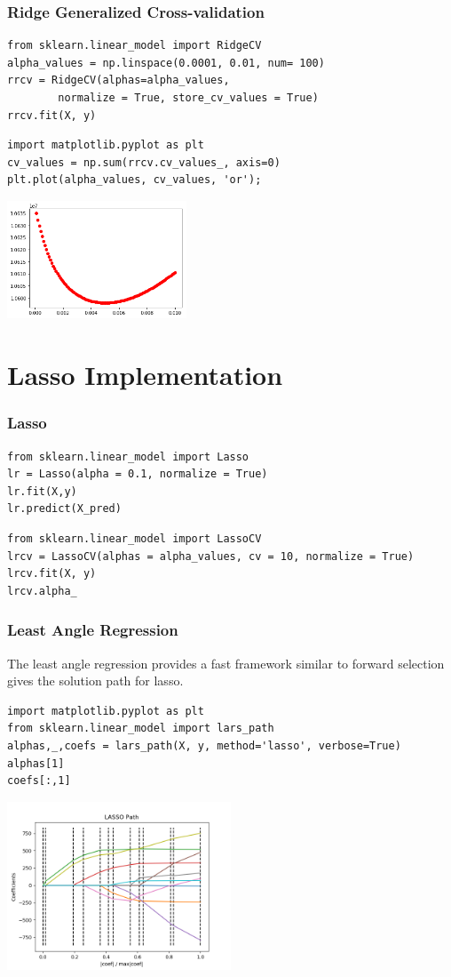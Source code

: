 \begin{frame}[fragile]\frametitle{Ridge Generalized Cross-validation}
\tiny
\begin{lstlisting}
from sklearn.linear_model import RidgeCV
alpha_values = np.linspace(0.0001, 0.01, num= 100)
rrcv = RidgeCV(alphas=alpha_values, 
		normalize = True, store_cv_values = True)
rrcv.fit(X, y)
\end{lstlisting}
\begin{lstlisting}
import matplotlib.pyplot as plt
cv_values = np.sum(rrcv.cv_values_, axis=0)
plt.plot(alpha_values, cv_values, 'or');
\end{lstlisting}
\includegraphics[width=0.4\textwidth]{fig/ridge_gcv}
\end{frame}

\section{Lasso Implementation}

\begin{frame}[fragile]\frametitle{Lasso}
\tiny	
\begin{lstlisting}
from sklearn.linear_model import Lasso
lr = Lasso(alpha = 0.1, normalize = True)
lr.fit(X,y)
lr.predict(X_pred)
\end{lstlisting} 
\pause
\begin{lstlisting}
from sklearn.linear_model import LassoCV
lrcv = LassoCV(alphas = alpha_values, cv = 10, normalize = True)
lrcv.fit(X, y)
lrcv.alpha_
\end{lstlisting} 
\end{frame}


\begin{frame}[fragile]\frametitle{Least Angle Regression}
The least angle regression provides a fast framework similar to forward selection gives the solution path for lasso.
{\tiny
\begin{lstlisting}
import matplotlib.pyplot as plt
from sklearn.linear_model import lars_path
alphas,_,coefs = lars_path(X, y, method='lasso', verbose=True)
alphas[1]
coefs[:,1]
\end{lstlisting} 
}
\includegraphics[width=0.5\textwidth]{fig/larspath}
\end{frame}

